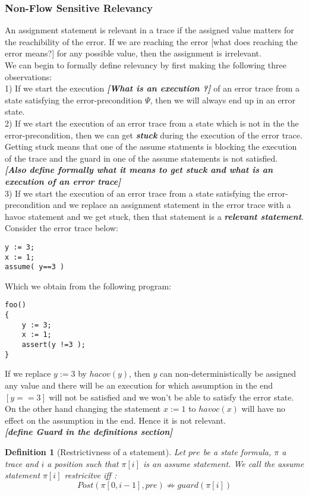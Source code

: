 \documentclass{article}
\newcommand{\limp}{\Rightarrow}
\newtheorem{mydef}{Definition}
\begin{document}
\newpage
\subsubsection{Non-Flow Sensitive Relevancy}
An assignment statement is relevant in a trace if the assigned value matters for the reachibility of the error. If we are reaching the error [what does reaching the error means?] for any possible value, then the assignment is irrelevant.\\
We can begin to formally define relevancy by first making the following three observations:\\
1) If we start the execution \textbf{\textit{[What is an execution ?]}} of an error trace from a state satisfying the error-precondition $\Psi$, then we will always end up in an error state. \\
2) If we start the execution of an error trace from a state which is not in the the error-precondition, then we can get \textit{\textbf{stuck}} during the execution of the error trace. Getting stuck means that one of the assume statments is blocking the execution of the trace and the guard in one of the assume statements is not satisfied. \\
\textbf{\textit{[Also define formally what it means to get stuck and what is an execution of an error trace]}}\\
3) If we start the execution of an error trace from a state satisfying the error-precondition and we replace an assignment statement in the error trace with a havoc statement and we get stuck, then that statement is a \textit{\textbf{relevant statement}}.\\
Consider the error trace below:
\begin{lstlisting}
y := 3;
x := 1;
assume( y==3 )
\end{lstlisting}
Which we obtain from the following program:
\begin{lstlisting}
foo()
{
	y := 3;
	x := 1;
	assert(y !=3 );
}
\end{lstlisting}
If we replace $y:=3$ by $hacov(y)$, then $y$ can non-deterministically be assigned any value and there will be an execution for which assumption in the end $[y==3]$ will not be satisfied and we won't be able to satisfy the error state.\\
On the other hand changing the statement $x := 1$ to $havoc(x)$ will have no effect on the assumption in the end. Hence it is not relevant.\\
\textit{\textbf{[define Guard in the definitions section]}}
\begin{mydef}[Restrictivness of a statement]
Let $pre$ be a state formula, $\pi$ a trace and $i$ a position such that $\pi[i]$ is an assume statement. We call the assume statement $\pi[i]$ \emph{restricitve} iff :
$$Post(\pi[0,i-1], pre) \not \limp guard(\pi[i])$$
\end{mydef}
\end{document}
